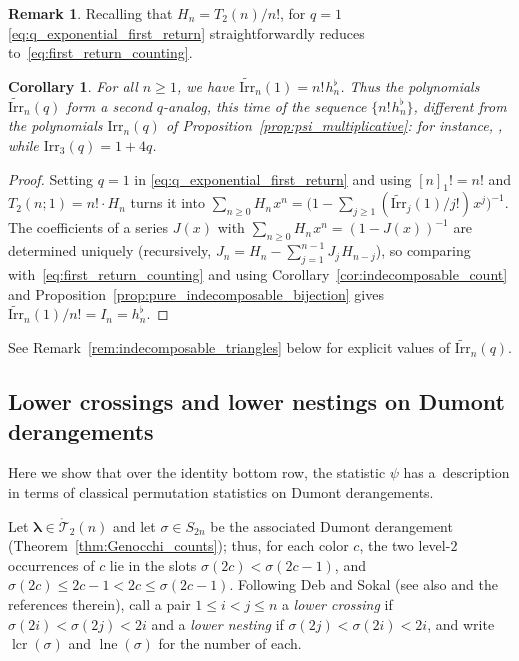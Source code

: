 \documentclass[pdftex]{sigma}
\numberwithin{equation}{section}
\newcommand{\ssp}{\hspace{1pt}}
\newtheorem{Corollary}[Theorem]{Corollary}
\theoremstyle{definition}
\newtheorem{Remark}[Theorem]{Remark}
\begin{document}
\begin{Remark}
Recalling that $H_n=T_2(n)/n!$, for $q=1$ \eqref{eq:q_exponential_first_return} straightforwardly reduces to~\eqref{eq:first_return_counting}.
\end{Remark}
\begin{Corollary}
	\label{cor:q_analog_full_hflat}
	For all $n\ge1$, we have
	$\widetilde{\mathrm{Irr}}_n(1)=n!\ssp h^\flat_n$.
	Thus the polynomials $\widetilde{\mathrm{Irr}}_n(q)$ form a second
	$q$-analog, this time of the sequence $\{n!\ssp h^\flat_n\}$,
	different from the polynomials $\mathrm{Irr}_n(q)$ of
	Proposition~{\rm \ref{prop:psi_multiplicative}}: for instance,
	, while
	$\mathrm{Irr}_3(q)=1+4q$.
\end{Corollary}
\begin{proof}
	Setting $q=1$ in \eqref{eq:q_exponential_first_return} and using
	$[n]_1!=n!$ and $T_2(n;1)=n!\cdot H_n$ turns it into
	$\sum_{n\ge0}H_n\ssp x^n
	=\bigl(1-\sum_{j\ge1}(\widetilde{\mathrm{Irr}}_j(1)/j!)\ssp
	x^j\bigr)^{-1}$.
	The coefficients of a series $J(x)$ with
	$\sum_{n\ge0}H_n\ssp x^n=(1-J(x))^{-1}$ are determined uniquely
	(recursively, $J_n=H_n-\sum_{j=1}^{n-1}J_j\ssp H_{n-j}$), so
	comparing with~\eqref{eq:first_return_counting} and using
	Corollary~\ref{cor:indecomposable_count} and Proposition~\ref{prop:pure_indecomposable_bijection}
	gives $\widetilde{\mathrm{Irr}}_n(1)/n!=I_n=h^\flat_n$.
\end{proof}

See Remark~\ref{rem:indecomposable_triangles} below for explicit values of
$\widetilde{\mathrm{Irr}}_n(q)$.

\subsection{Lower crossings and lower nestings on Dumont derangements}
\label{subsec:crossings_nestings}

Here we show that over the identity bottom row, the
statistic $\psi$ has a~description in terms of classical
permutation statistics on Dumont derangements.

Let $\boldsymbol\lambda\in\mathring{\mathcal{T}}_2(n)$ and let $\sigma\in
S_{2n}$ be the associated Dumont derangement (Theorem~\ref{thm:Genocchi_counts});
thus, for each color $c$, the two level-$2$ occurrences of $c$ lie in the
slots $\sigma(2c)<\sigma(2c-1)$, and $\sigma(2c)\le 2c-1<2c\le\sigma(2c-1)$.
Following Deb and Sokal \cite{DebSokal2024} (see also \cite{SokalZeng2022} and the references therein), call a pair $1\le i<j\le n$ a
\emph{lower crossing} if $\sigma(2i)<\sigma(2j)<2i$ and a \emph{lower
nesting} if $\sigma(2j)<\sigma(2i)<2i$, and write
$\operatorname{lcr}(\sigma)$ and $\operatorname{lne}(\sigma)$ for the number
of each.
\end{document}
